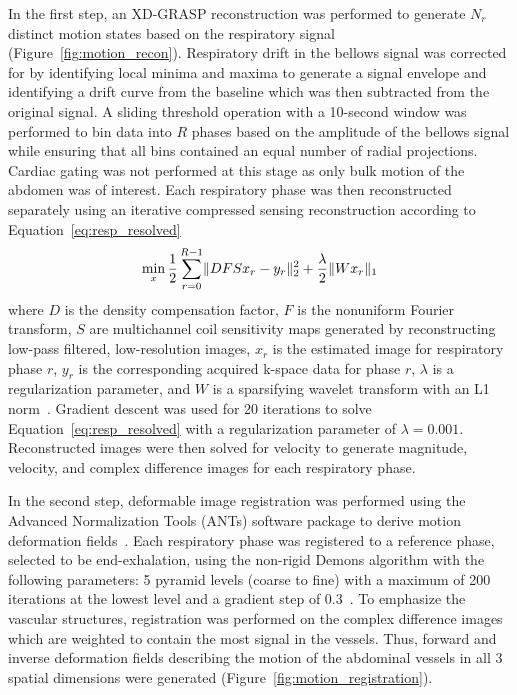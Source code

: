 In the first step, an XD-GRASP reconstruction was performed to generate $N_r$ distinct motion states based on the respiratory signal~\cite{fengXDGRASPGoldenangleRadial2016} (Figure~\ref{fig:motion_recon}). Respiratory drift in the bellows signal was corrected for by identifying local minima and maxima to generate a signal envelope and identifying a drift curve from the baseline which was then subtracted from the original signal. A sliding threshold operation with a 10-second window was performed to bin data into $R$ phases based on the amplitude of the bellows signal while ensuring that all bins contained an equal number of radial projections. Cardiac gating was not performed at this stage as only bulk motion of the abdomen was of interest. Each respiratory phase was then reconstructed separately using an iterative compressed sensing reconstruction according to Equation~\ref{eq:resp_resolved}
\begin{equation}
    \min_x \frac{1}{2} \sum_{r=0}^{R-1} \lVert DFSx_{r} - y_{r} \rVert_2^2 + \frac{\lambda}{2} \lVert Wx_r \rVert_1 \\
    \label{eq:resp_resolved}
\end{equation}
where $D$ is the density compensation factor, $F$ is the nonuniform Fourier transform, $S$ are multichannel coil sensitivity maps generated by reconstructing low-pass filtered, low-resolution images, $x_{r}$ is the estimated image for respiratory phase $r$, $y_r$ is the corresponding acquired k-space data for phase $r$, $\lambda$ is a regularization parameter, and $W$ is a sparsifying wavelet transform with an L1 norm~\cite{lustigSparseMRIApplication2007}. Gradient descent was used for 20 iterations to solve Equation~\ref{eq:resp_resolved} with a regularization parameter of $\lambda = 0.001$. Reconstructed images were then solved for velocity to generate magnitude, velocity, and complex difference images for each respiratory phase.

In the second step, deformable image registration was performed using the Advanced Normalization Tools (ANTs) software package to derive motion deformation fields~\cite{tustisonANTsXEcosystemQuantitative2021}. Each respiratory phase was registered to a reference phase, selected to be end-exhalation, using the non-rigid Demons algorithm with the following parameters: 5 pyramid levels (coarse to fine) with a maximum of 200 iterations at the lowest level and a gradient step of 0.3~\cite{vercauterenDiffeomorphicDemonsEfficient2009}. To emphasize the vascular structures, registration was performed on the complex difference images which are weighted to contain the most signal in the vessels. Thus, forward and inverse deformation fields describing the motion of the abdominal vessels in all 3 spatial dimensions were generated (Figure~\ref{fig:motion_registration}).


